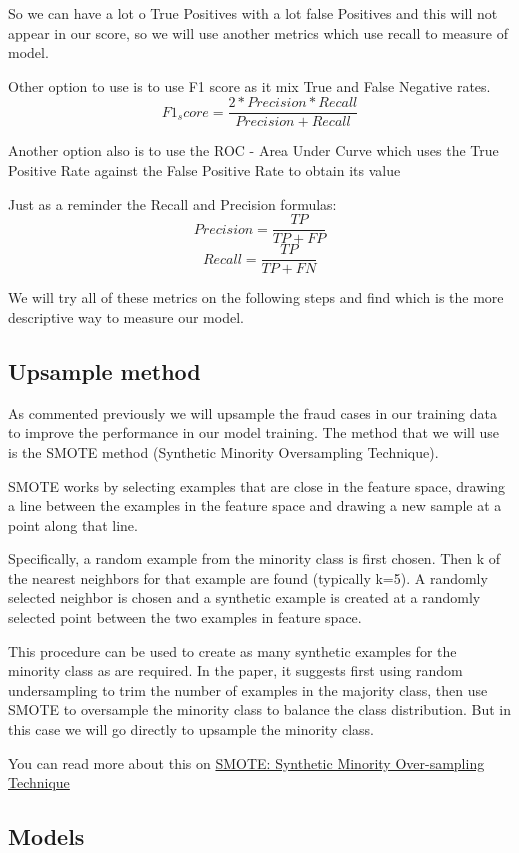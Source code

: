 \documentclass[
]{article}
\begin{document}
So we can have a lot o True Positives with a lot false Positives and
this will not appear in our score, so we will use another metrics which
use recall to measure of model.

Other option to use is to use F1 score as it mix True and False Negative
rates. \[F1_score =  \frac{2*Precision * Recall}{Precision+Recall}\]

Another option also is to use the ROC - Area Under Curve which uses the
True Positive Rate against the False Positive Rate to obtain its value

Just as a reminder the Recall and Precision formulas:
\[Precision = \frac{TP}{TP + FP}\] \[Recall = \frac{TP}{TP + FN}\]

We will try all of these metrics on the following steps and find which
is the more descriptive way to measure our model.

\hypertarget{upsample-method}{%
\subsection{Upsample method}\label{upsample-method}}

As commented previously we will upsample the fraud cases in our training
data to improve the performance in our model training. The method that
we will use is the SMOTE method (Synthetic Minority Oversampling
Technique).

SMOTE works by selecting examples that are close in the feature space,
drawing a line between the examples in the feature space and drawing a
new sample at a point along that line.

Specifically, a random example from the minority class is first chosen.
Then k of the nearest neighbors for that example are found (typically
k=5). A randomly selected neighbor is chosen and a synthetic example is
created at a randomly selected point between the two examples in feature
space.

This procedure can be used to create as many synthetic examples for the
minority class as are required. In the paper, it suggests first using
random undersampling to trim the number of examples in the majority
class, then use SMOTE to oversample the minority class to balance the
class distribution. But in this case we will go directly to upsample the
minority class.

You can read more about this on
\href{https://arxiv.org/abs/1106.1813}{SMOTE: Synthetic Minority
Over-sampling Technique}

\hypertarget{models}{%
\subsection{Models}\label{models}}
\end{document}
